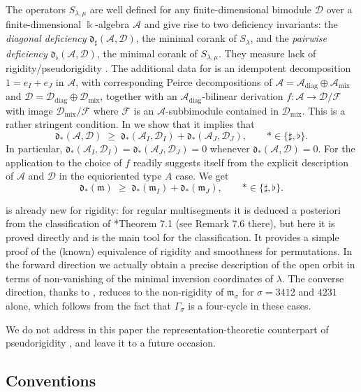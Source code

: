 \documentclass[12pt]{article}
\def\xspace{ }%
\theoremstyle{definition}
\newcommand{\prigity}{pseudorigidity\xspace}
\newcommand{\dgd}{diagonal deficiency\xspace}
\newcommand{\pwd}{pairwise deficiency\xspace}
\newcommand{\mix}{\mathrm{mix}}   %
\newcommand{\diag}{\mathrm{diag}} %
\newcommand{\mm}{\mathfrak{m}}
\newcommand{\kk}{\Bbbk}
\newcommand{\alg}{\mathcal{A}}   %
\newcommand{\bmdl}{\mathcal{D}}   %
\newcommand{\Ff}{\mathcal{F}}   %
\newcommand{\dfr}{\mathfrak{d}}  %
\newcommand{\Sop}{S}
\newcommand{\rsub}{\sharp}       %
\newcommand{\psub}{\flat}        %
\newcommand{\cgr}{\Gamma}                 %
\begin{document}
The operators $\Sop_{\lambda,\mu}$ are well defined for any finite-dimensional bimodule $\bmdl$ over a finite-dimensional $\kk$-algebra $\alg$
and give rise to two deficiency invariants: the \emph{\dgd} $\dfr_\rsub(\alg,\bmdl)$,
the minimal corank of $\Sop_\lambda$, and the \emph{\pwd} $\dfr_\psub(\alg,\bmdl)$,
the minimal corank of $\Sop_{\lambda,\mu}$.
They measure lack of rigidity/\prigity.
The additional data for  is an idempotent decomposition $1=e_I+e_J$ in $\alg$, with corresponding Peirce decompositions
of $\alg=\alg_{\diag}\oplus\alg_{\mix}$ and $\bmdl=\bmdl_{\diag}\oplus\bmdl_{\mix}$, together with an $\alg_{\diag}$-bilinear derivation
$f:\alg\rightarrow\bmdl/\Ff$ with image $\bmdl_{\mix}/\Ff$ where $\Ff$ is an $\alg$-subbimodule contained in $\bmdl_{\mix}$.
This is a rather stringent condition. In  we show that it implies that
\[
   \dfr_\ast(\alg,\bmdl) \;\ge\; \dfr_\ast(\alg_I,\bmdl_I) + \dfr_\ast(\alg_J,\bmdl_J), \qquad \ast \in \{\rsub,\psub\}.
\]
In particular, $\dfr_\ast(\alg_I,\bmdl_I) = \dfr_\ast(\alg_J,\bmdl_J) = 0$ whenever $\dfr_\ast(\alg,\bmdl) = 0$.
For the application to  the choice of $f$ readily suggests itself from the explicit description of $\alg$ and $\bmdl$ in the equioriented type $A$ case.
We get
\[
   \dfr_\ast(\mm) \;\ge\; \dfr_\ast(\mm_I) + \dfr_\ast(\mm_J), \qquad \ast \in \{\rsub,\psub\}.
\]

 is already new for rigidity: for regular multisegments it is deduced a posteriori from the
classification of \cite{MR3866895}*{Theorem 7.1} (see Remark 7.6 there), but here it is proved directly
and is the main tool for the classification.
It provides a simple proof of the (known) equivalence of rigidity and smoothness for permutations.
In the forward direction we actually obtain a precise description of the open orbit in terms of non-vanishing of the minimal inversion coordinates
of $\lambda$. The converse direction, thanks to ,
reduces to the non-rigidity of $\mm_\sigma$ for $\sigma=3412$ and $4231$ alone,
which follows from the fact that $\cgr_\sigma$ is a four-cycle in these cases.

We do not address in this paper the representation-theoretic counterpart of \prigity, and leave it to a future occasion.

\subsection{Conventions}
\end{document}
